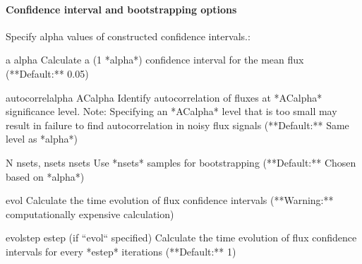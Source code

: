 \documentclass[letterpaper,10pt,english]{sphinxmanual}
\begin{document}
\begin{sphinxVerbatim}[commandchars=\\\{\}]
 
        
   

 
    
       
\end{sphinxVerbatim}


\paragraph{Confidence interval and bootstrapping options}
\label{\detokenize{users_guide/command_line_tools/w_fluxanl:confidence-interval-and-bootstrapping-options}}
Specify alpha values of constructed confidence intervals.:

\begin{sphinxVerbatim}[commandchars=\\\{\}]
\PYGZhy{}a alpha
  Calculate a (1 \PYGZhy{} *alpha*) confidence interval for the mean flux
  (**Default:** 0.05)

\PYGZhy{}\PYGZhy{}autocorrel\PYGZhy{}alpha ACalpha
  Identify autocorrelation of fluxes at *ACalpha* significance level.
  Note: Specifying an *ACalpha* level that is too small may result in
  failure to find autocorrelation in noisy flux signals (**Default:**
  Same level as *alpha*)

\PYGZhy{}N n\PYGZus{}sets, \PYGZhy{}\PYGZhy{}nsets n\PYGZus{}sets
  Use *n\PYGZus{}sets* samples for bootstrapping (**Default:** Chosen based
  on *alpha*)

\PYGZhy{}\PYGZhy{}evol
  Calculate the time evolution of flux confidence intervals
  (**Warning:** computationally expensive calculation)

\PYGZhy{}\PYGZhy{}evol\PYGZhy{}step estep
  (if ``\PYGZsq{}\PYGZhy{}\PYGZhy{}evol\PYGZsq{}`` specified) Calculate the time evolution of flux
  confidence intervals for every *estep* iterations (**Default:** 1)
\end{sphinxVerbatim}
\end{document}
